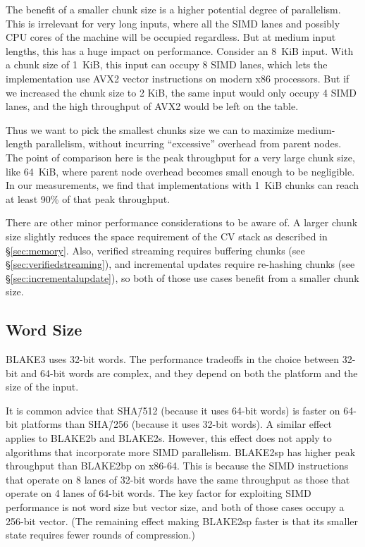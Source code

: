 \documentclass[11pt,notitlepage,a4paper]{article}
\begin{document}
The benefit of a smaller chunk size is a higher potential degree of
parallelism. This is irrelevant for very long inputs, where all the SIMD lanes
and possibly CPU cores of the machine will be occupied regardless. But at
medium input lengths, this has a huge impact on performance. Consider an 8~KiB
input. With a chunk size of 1~KiB, this input can occupy 8 SIMD lanes, which
lets the implementation use AVX2 vector instructions on modern x86 processors.
But if we increased the chunk size to 2 KiB, the same input would only occupy 4
SIMD lanes, and the high throughput of AVX2 would be left on the table.

Thus we want to pick the smallest chunks size we can to maximize medium-length
parallelism, without incurring ``excessive'' overhead from parent nodes. The
point of comparison here is the peak throughput for a very large chunk size,
like 64~KiB, where parent node overhead becomes small enough to be negligible.
In our measurements, we find that implementations with 1~KiB chunks can reach
at least 90\% of that peak throughput.

There are other minor performance considerations to be aware of. A larger chunk
size slightly reduces the space requirement of the CV stack as described in
\S\ref{sec:memory}. Also, verified streaming requires buffering chunks (see
\S\ref{sec:verifiedstreaming}), and incremental updates require re-hashing
chunks (see \S\ref{sec:incrementalupdate}), so both of those use cases benefit
from a smaller chunk size.

\subsection{Word Size}\label{sec:wordsize}

BLAKE3 uses 32-bit words. The performance tradeoffs in the choice between
32-bit and 64-bit words are complex, and they depend on both the platform and
the size of the input.

It is common advice that SHA\=/512 (because it uses 64-bit words) is faster on
64-bit platforms than SHA\=/256 (because it uses 32-bit words). A similar
effect applies to BLAKE2b and BLAKE2s. However, this effect does not apply to
algorithms that incorporate more SIMD parallelism. BLAKE2sp has higher peak
throughput than BLAKE2bp on x86-64. This is because the SIMD instructions that
operate on 8 lanes of 32-bit words have the same throughput as those that
operate on 4 lanes of 64-bit words. The key factor for exploiting SIMD
performance is not word size but vector size, and both of those cases occupy a
256-bit vector. (The remaining effect making BLAKE2sp faster is that its
smaller state requires fewer rounds of compression.)
\end{document}
